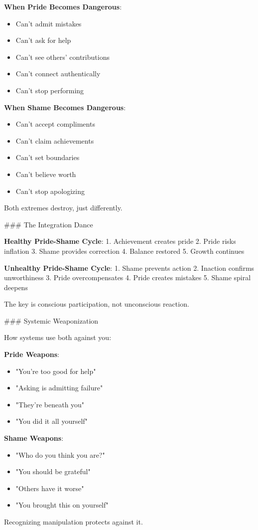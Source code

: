 \documentclass[12pt]{book}
\begin{document}
\textbf{When Pride Becomes Dangerous}:
\begin{itemize}
\item Can't admit mistakes
\item Can't ask for help
\item Can't see others' contributions
\item Can't connect authentically
\item Can't stop performing

\end{itemize}
\textbf{When Shame Becomes Dangerous}:
\begin{itemize}
\item Can't accept compliments
\item Can't claim achievements
\item Can't set boundaries
\item Can't believe worth
\item Can't stop apologizing

\end{itemize}
Both extremes destroy, just differently.

\#\#\# The Integration Dance

\textbf{Healthy Pride-Shame Cycle}:
1. Achievement creates pride
2. Pride risks inflation
3. Shame provides correction
4. Balance restored
5. Growth continues

\textbf{Unhealthy Pride-Shame Cycle}:
1. Shame prevents action
2. Inaction confirms unworthiness
3. Pride overcompensates
4. Pride creates mistakes
5. Shame spiral deepens

The key is conscious participation, not unconscious reaction.

\#\#\# Systemic Weaponization

How systems use both against you:

\textbf{Pride Weapons}:
\begin{itemize}
\item "You're too good for help"
\item "Asking is admitting failure"
\item "They're beneath you"
\item "You did it all yourself"

\end{itemize}
\textbf{Shame Weapons}:
\begin{itemize}
\item "Who do you think you are?"
\item "You should be grateful"
\item "Others have it worse"
\item "You brought this on yourself"

\end{itemize}
Recognizing manipulation protects against it.
\end{document}
